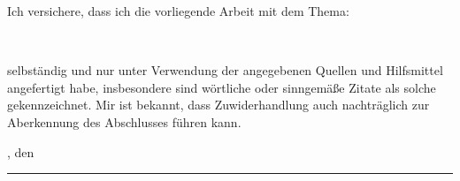 Ich versichere, dass ich die vorliegende Arbeit mit dem Thema:

\begin{center}
\textit{\glqq\titel\grqq}\\[1em]
\end{center}
			
selbständig und nur unter Verwendung der angegebenen Quellen und Hilfsmittel angefertigt habe, insbesondere sind wörtliche oder sinngemäße Zitate als solche gekennzeichnet. Mir ist bekannt, dass Zuwiderhandlung auch nachträglich zur Aberkennung des Abschlusses führen kann.
\par
\ort, den \eingereicht


\rule[-0.2cm]{5cm}{0.5pt}

\textsc{\autor} 
